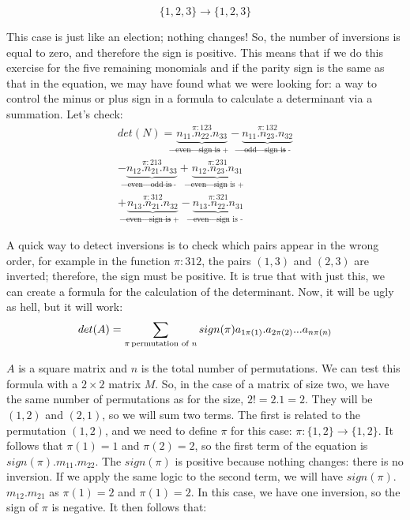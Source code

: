 \documentclass[a4,12pt,twosided,openany]{memoir}
\begin{document}
\[\lbrace 1,2,3 \rbrace \rightarrow \lbrace 1,2,3 \rbrace\] 
\par 
\indent
This case is just like an election; nothing changes! So, the number of inversions is equal to zero, and therefore the sign is positive. This means that if we do this exercise for the five remaining monomials and if the parity sign is the same as that in the equation, we may have found what we were looking for: a way to control the minus or plus sign in a formula to calculate a determinant via a summation. Let’s check:
\begin{equation}\label{eq:polDet}
\begin{split}
det(N) = \underbrace{n_{11}.n_{22}.n_{33}}_{\text{even} \rightarrow \text{sign is +}}^{\pi:123} - \underbrace{n_{11}.n_{23}.n_{32}}_{\text{odd} \rightarrow \text{sign is -}}^{\pi:132} \\
 - \underbrace{ n_{12}.n_{21}.n_{33}}_{\text{even} \rightarrow \text{odd is -}}^{\pi:213} +  \underbrace{n_{12}.n_{23}.n_{31}}_{\text{even} \rightarrow \text{sign is +} }^{\pi:231} \\
  +  \underbrace{n_{13}.n_{21}.n_{32}}_{\text{even} \rightarrow \text{sign is +} }^{\pi:312} -  \underbrace{n_{13}.n_{22}.n_{31}}_{\text{even} \rightarrow \text{sign is -}}^{\pi:321}
\end{split}
\end{equation}
\par 
\indent
A quick way to detect inversions is to check which pairs appear in the wrong order, for example in the function $\pi:312$, the pairs $(1,3)$ and $(2,3)$ are inverted; therefore, the sign must be positive. It is true that with just this, we can create a formula for the calculation of the determinant. Now, it will be ugly as hell, but it will work: 
\begin{equation}\label{eq:detsign}
det(A) = \sum_{\pi \text{\hspace{0.5 mm}permutation of } n} sign(\pi) a_{1\pi(1)}.a_{2\pi(2)}...a_{n\pi(n)}
\end{equation}
\par 
\indent
$A$ is a square matrix and $n$ is the total number of permutations. We can test this formula with a $2 \times 2$ matrix $M$. So, in the case of a matrix of size two, we have the same number of permutations as for the size, $2!=2.1=2$. They will be $(1,2)$ and $(2,1)$, so we will sum two terms. The first is related to the permutation $(1,2)$, and we need to define $\pi$ for this case: $\pi:\lbrace 1,2 \rbrace \rightarrow \lbrace 1,2 \rbrace$. It follows that $\pi(1) = 1$ and $\pi(2) = 2$, so the first term of the equation is $sign(\pi)$.$m_{11}$.$m_{22}$. The $sign(\pi)$ is positive because nothing changes: there is no inversion. If we apply the same logic to the second term, we will have $sign(\pi)$.$m_{12}$.$m_{21}$ as $\pi(1) = 2$ and $\pi(1) = 2$. In this case, we have one inversion, so the sign of $\pi$ is negative. It then follows that:
\end{document}
